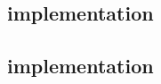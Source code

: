 \documentclass[uplatex,dvipdfmx]{jsarticle} \usepackage{amsmath,amssymb,bm}
\begin{document}
\subsection*{implementation}


\subsection*{implementation}


\vspace{\baselineskip}
\begin{paracol}{2}
\switchcolumn
\end{paracol}
\end{document}
